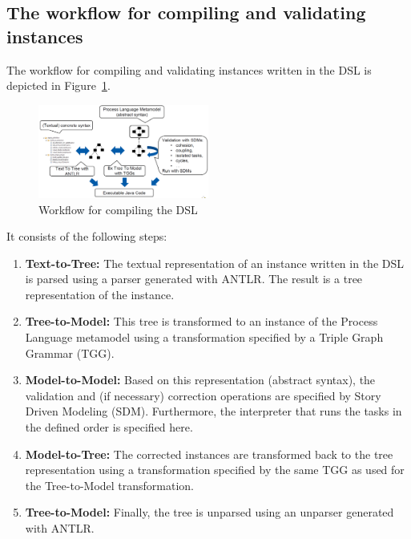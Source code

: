 \subsection{The workflow for compiling and validating instances}
\label{sec: The workflow for compiling and validating instances}
The workflow for compiling and validating instances written in the DSL is depicted in Figure~\ref{fig: Workflow to Compile the DSL}.  


\begin{figure}[ht]
\begin{center} 
\includegraphics[width=0.5\textwidth]{figures/workflow.png} 
\end{center}
\caption{Workflow for compiling the DSL}
\label{fig: Workflow to Compile the DSL}
\end{figure}  




It consists of the following steps:
\begin{enumerate}[1)]
 \item \textbf{Text-to-Tree:}  The textual representation of an instance written in the DSL is parsed using a parser generated with ANTLR. The result is a tree representation of the instance. 
 \item \label{enumF2}\textbf{Tree-to-Model:} This tree is transformed to an instance of the Process Language metamodel using a transformation specified by a Triple Graph Grammar (TGG).
 \item \textbf{Model-to-Model:} Based on this representation (abstract syntax), the validation and (if necessary) correction operations are specified by Story Driven Modeling (SDM). Furthermore, the interpreter that runs the tasks in the defined order is specified here.
 \item \textbf{Model-to-Tree:} The corrected instances are transformed back to the tree representation using a transformation specified by the same TGG as used for the Tree-to-Model transformation.
 \item \textbf{Tree-to-Model:} Finally, the tree is unparsed using an unparser generated with ANTLR. 
\end{enumerate}




